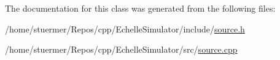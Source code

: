 The documentation for this class was generated from the following files\+:\begin{DoxyCompactItemize}
\item 
/home/stuermer/\+Repos/cpp/\+Echelle\+Simulator/include/\hyperlink{source_8h}{source.\+h}\item 
/home/stuermer/\+Repos/cpp/\+Echelle\+Simulator/src/\hyperlink{source_8cpp}{source.\+cpp}\end{DoxyCompactItemize}
